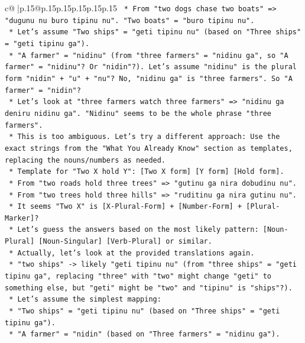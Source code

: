 \documentclass{article}
\begin{document}
{\begin{supertabular}{c@{$\;$}|p{.15\linewidth}@{}p{.15\linewidth}p{.15\linewidth}p{.15\linewidth}p{.15\linewidth}p{.15\linewidth}}
{{{\texttt{                *   From "two dogs chase two boats" => "dugunu nu buro tipinu nu". "Two boats" = "buro tipinu nu".} \\
\texttt{                *   Let's assume "Two ships" = "geti tipinu nu" (based on "Three ships" = "geti tipinu ga").} \\
\texttt{                *   "A farmer" = "nidinu" (from "three farmers" = "nidinu ga", so "A farmer" = "nidinu"? Or "nidin"?). Let's assume "nidinu" is the plural form "nidin" + "u" + "nu"? No, "nidinu ga" is "three farmers". So "A farmer" = "nidin"?} \\
\texttt{                *   Let's look at "three farmers watch three farmers" => "nidinu ga deniru nidinu ga". "Nidinu" seems to be the whole phrase "three farmers".} \\
\texttt{                *   This is too ambiguous. Let's try a different approach: Use the exact strings from the "What You Already Know" section as templates, replacing the nouns/numbers as needed.} \\
\texttt{                *   Template for "Two X hold Y": {[}Two X form{]} {[}Y form{]} {[}Hold form{]}.} \\
\texttt{                *   From "two roads hold three trees" => "gutinu ga nira dobudinu nu".} \\
\texttt{                *   From "two trees hold three hills" => "ruditinu ga nira gutinu nu".} \\
\texttt{                *   It seems "Two X" is {[}X{-}Plural{-}Form{]} + {[}Number{-}Form{]} + {[}Plural{-}Marker{]}?} \\
\texttt{                *   Let's guess the answers based on the most likely pattern: {[}Noun{-}Plural{]} {[}Noun{-}Singular{]} {[}Verb{-}Plural{]} or similar.} \\
\texttt{                *   Actually, let's look at the provided translations again.} \\
\texttt{                *   "two ships" {-}> likely "geti tipinu nu" (from "three ships" = "geti tipinu ga", replacing "three" with "two" might change "geti" to something else, but "geti" might be "two" and "tipinu" is "ships"?).} \\
\texttt{                *   Let's assume the simplest mapping:} \\
\texttt{                    *   "Two ships" = "geti tipinu nu" (based on "Three ships" = "geti tipinu ga").} \\
\texttt{                    *   "A farmer" = "nidin" (based on "Three farmers" = "nidinu ga").} \\
}}}
\end{supertabular}}
\end{document}
